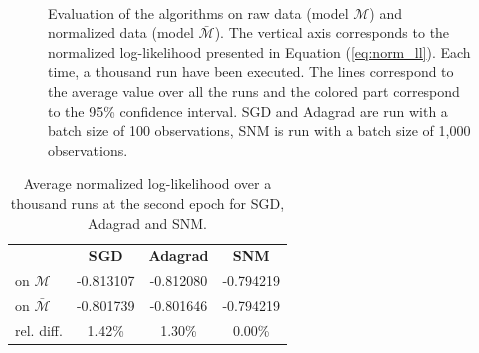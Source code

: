 \documentclass[conference]{IEEEtran}
\begin{document}
\begin{figure}[t]
    \centering
    ~
    ~
    \caption{Evaluation of the algorithms on raw data (model $\mathcal{M}$) and normalized data (model $\bar{\mathcal{M}}$). The vertical axis corresponds to the normalized log-likelihood presented in Equation (\ref{eq:norm_ll}). Each time, a thousand run have been executed. The lines correspond to the average value over all the runs and the colored part correspond to the 95\% confidence interval. SGD and Adagrad are run with a batch size of 100 observations, SNM is run with a batch size of 1,000 observations.}
    \label{fig:norm_unorm}
    \vspace{-0.5cm}
\end{figure}

\begin{table}
\centering
\renewcommand\arraystretch{1.2}
\begin{tabular}{l|ccc}
\multicolumn{1}{l}{} & {\bf SGD} & {\bf Adagrad} & {\bf SNM} \\ \cline{2-4}
on $\mathcal{M}$ & -0.813107 & -0.812080 & -0.794219 \\
on $\bar{\mathcal{M}}$ & -0.801739 & -0.801646
 & -0.794219 \\ \hline
rel. diff.  & 1.42\% & 1.30\% & 0.00\%
\end{tabular}
\caption{\label{tab:res_norm_unorm} Average normalized log-likelihood over a thousand runs at the second epoch for SGD, Adagrad and SNM.}
\vspace{-0.9cm}
\end{table}
\end{document}
